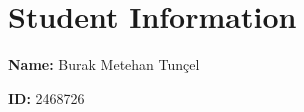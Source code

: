 \documentclass{article}
\begin{document}
\section*{Student Information}

\textbf{Name:} Burak Metehan Tunçel

\textbf{ID:} 2468726



\newpage




\end{document}
